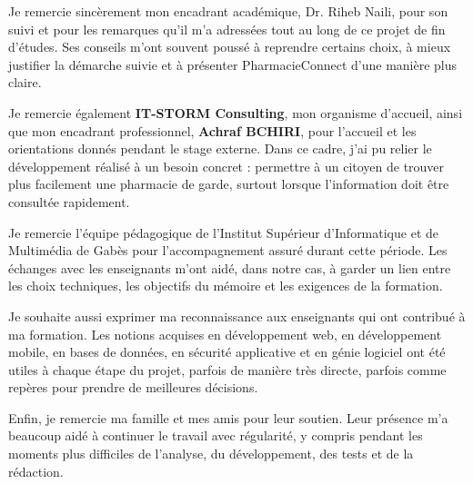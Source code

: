 Je remercie sincèrement mon encadrant académique, Dr. Riheb Naili, pour son suivi et pour les remarques
qu'il m'a adressées tout au long de ce projet de fin d'études. Ses conseils m'ont souvent poussé à reprendre
certains choix, à mieux justifier la démarche suivie et à présenter PharmacieConnect d'une manière plus claire.

Je remercie également \textbf{IT-STORM Consulting}, mon organisme d'accueil, ainsi que mon encadrant
professionnel, \textbf{Achraf BCHIRI}, pour l'accueil et les orientations donnés pendant le stage externe.
Dans ce cadre, j'ai pu relier le développement réalisé à un besoin concret : permettre à un citoyen de
trouver plus facilement une pharmacie de garde, surtout lorsque l'information doit être consultée rapidement.

Je remercie l'équipe pédagogique de l'Institut Supérieur d'Informatique et de Multimédia de Gabès pour
l'accompagnement assuré durant cette période. Les échanges avec les enseignants m'ont aidé, dans notre cas,
à garder un lien entre les choix techniques, les objectifs du mémoire et les exigences de la formation.

Je souhaite aussi exprimer ma reconnaissance aux enseignants qui ont contribué à ma formation. Les notions
acquises en développement web, en développement mobile, en bases de données, en sécurité applicative et en
génie logiciel ont été utiles à chaque étape du projet, parfois de manière très directe, parfois comme repères
pour prendre de meilleures décisions.

Enfin, je remercie ma famille et mes amis pour leur soutien. Leur présence m'a beaucoup aidé à continuer le
travail avec régularité, y compris pendant les moments plus difficiles de l'analyse, du développement, des
tests et de la rédaction.
